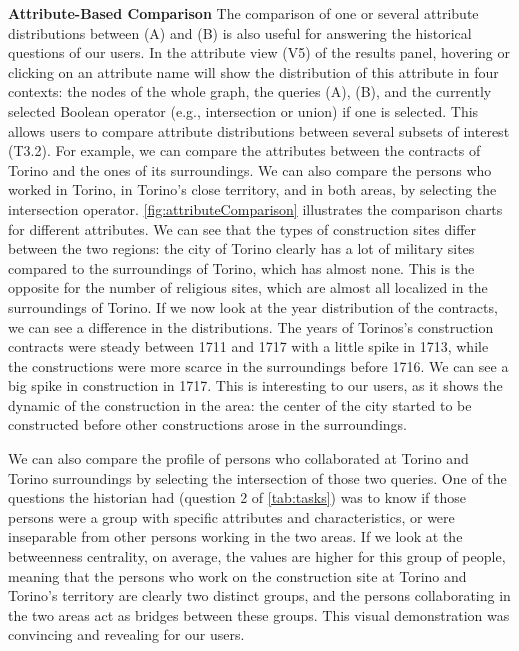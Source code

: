 \noindent\textbf{Attribute-Based Comparison}
The comparison of one or several attribute distributions between (A) and (B) is also useful for answering the historical questions of our users.
In the attribute view (V5) of the results panel, hovering or clicking on an attribute name will show the distribution of this attribute in four contexts: the nodes of the whole graph, the queries (A), (B), and the currently selected Boolean operator (e.g., intersection or union) if one is selected.
This allows users to compare attribute distributions between several subsets of interest (T3.2).
For example, we can compare the attributes between the contracts of Torino and the ones of its surroundings.
We can also compare the persons who worked in Torino, in Torino's close territory, and in both areas, by selecting the intersection operator.
\autoref{fig:attributeComparison} illustrates the comparison charts for different attributes.
We can see that the types of construction sites differ between the two regions: the city of Torino clearly has a lot of military sites compared to the surroundings of Torino, which has almost none.
This is the opposite for the number of religious sites, which are almost all localized in the surroundings of Torino.
If we now look at the year distribution of the contracts, we can see a difference in the distributions.
The years of Torinos's construction contracts were steady between 1711 and 1717 with a little spike in 1713, while the constructions were more scarce in the surroundings before 1716.
We can see a big spike in construction in 1717.
This is interesting to our users, as it shows the dynamic of the construction in the area: the center of the city started to be constructed before other constructions arose in the surroundings.

We can also compare the profile of persons who collaborated at Torino and Torino surroundings by selecting the intersection of those two queries.
One of the questions the historian had (question 2 of \autoref{tab:tasks}) was to know if those persons were a group with specific attributes and characteristics, or were inseparable from other persons working in the two areas.
If we look at the betweenness centrality, on average, the values are higher for this group of people, meaning that the persons who work on the construction site at Torino and Torino's territory are clearly two distinct groups, and the persons collaborating in the two areas act as bridges between these groups.
This visual demonstration was convincing and revealing for our users.

